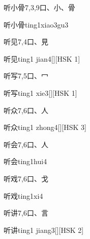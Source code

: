 \begin{entry}{听小骨}{7,3,9}{⼝、⼩、⾻}
  \begin{phonetics}{听小骨}{ting1xiao3gu3}
  \end{phonetics}
\end{entry}

\begin{entry}{听见}{7,4}{⼝、⾒}
  \begin{phonetics}{听见}{ting1 jian4}[][HSK 1]
  \end{phonetics}
\end{entry}

\begin{entry}{听写}{7,5}{⼝、⼍}
  \begin{phonetics}{听写}{ting1 xie3}[][HSK 1]
  \end{phonetics}
\end{entry}

\begin{entry}{听众}{7,6}{⼝、⼈}
  \begin{phonetics}{听众}{ting1 zhong4}[][HSK 3]
  \end{phonetics}
\end{entry}

\begin{entry}{听会}{7,6}{⼝、⼈}
  \begin{phonetics}{听会}{ting1hui4}
  \end{phonetics}
\end{entry}

\begin{entry}{听戏}{7,6}{⼝、⼽}
  \begin{phonetics}{听戏}{ting1xi4}
  \end{phonetics}
\end{entry}

\begin{entry}{听讲}{7,6}{⼝、⾔}
  \begin{phonetics}{听讲}{ting1 jiang3}[][HSK 2]
  \end{phonetics}
\end{entry}

